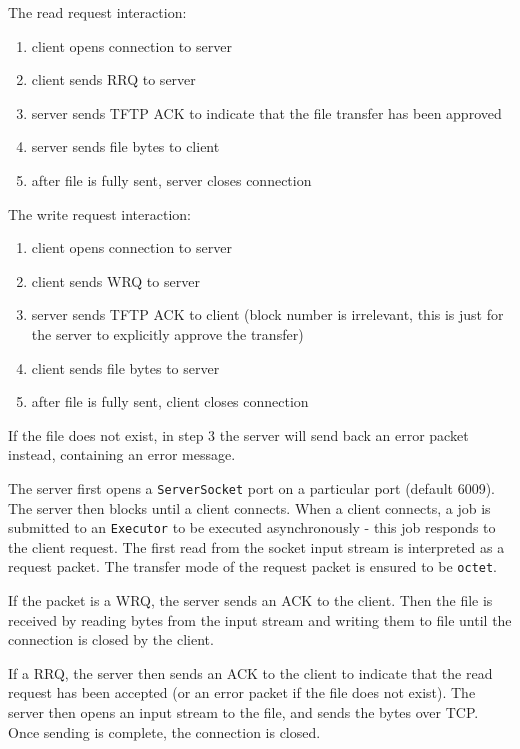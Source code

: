 \documentclass[a4paper]{article}
\newcommand{\code}{\texttt}
\begin{document}
\begin{minipage}[t]{.5\textwidth}
The read request interaction:
\begin{enumerate}
\item client opens connection to server
\item client sends RRQ to server
\item server sends TFTP ACK to indicate that the file transfer has been approved
\item server sends file bytes to client
\item after file is fully sent, server closes connection 
\end{enumerate}
\end{minipage}%
\begin{minipage}[t]{.5\textwidth}
The write request interaction:
\begin{enumerate}
\item client opens connection to server
\item client sends WRQ to server
\item server sends TFTP ACK to client (block number is irrelevant, this is just for the server to explicitly approve the transfer)
\item client sends file bytes to server
\item after file is fully sent, client closes connection
\end{enumerate}
\end{minipage}

If the file does not exist, in step 3 the server will send back an error packet instead, containing an error message.

The server first opens a \code{ServerSocket} port on a particular port (default 6009). The server then blocks until a client connects. When a client connects, a job is submitted to an \code{Executor} to be executed asynchronously - this job responds to the client request. The first read from the socket input stream is interpreted as a request packet. The transfer mode of the request packet is ensured to be \code{octet}.

If the packet is a WRQ, the server sends an ACK to the client. Then the file is received by reading bytes from the input stream and writing them to file until the connection is closed by the client.

If a RRQ, the server then sends an ACK to the client to indicate that the read request has been accepted (or an error packet if the file does not exist). The server then opens an input stream to the file, and sends the bytes over TCP. Once sending is complete, the connection is closed.
\end{document}
